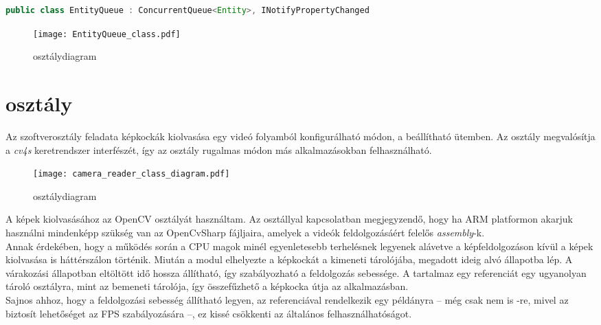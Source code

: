 \begin{mdframed}[backgroundcolor=gray!20]
\begin{small}
\begin{scriptsize}
\begin{lstlisting}[language=java]
public class EntityQueue : ConcurrentQueue<Entity>, INotifyPropertyChanged
\end{lstlisting}
\end{scriptsize}
\end{small}
\end{mdframed}

\begin{figure}[h]
\texttt{[image: EntityQueue\_class.pdf]}
\centering
\caption{ osztálydiagram}
\label{fig:entity_queue_class_diagram}
\end{figure}

\section{ osztály}

Az szoftverosztály feladata képkockák kiolvasása egy videó folyamból konfigurálható módon, a beállítható ütemben. Az osztály megvalósítja a \emph{cv4s} keretrendszer  interfészét, így az osztály rugalmas módon más alkalmazásokban felhasználható. \newpage
\begin{wrapfigure}{r}{7.5cm}
\texttt{[image: camera\_reader\_class\_diagram.pdf]}
\caption{ osztálydiagram}\label{fig:camera_reader_class_diagram}
\end{wrapfigure} 
A képek kiolvasásához az OpenCV  osztályát használtam. Az osztállyal kapcsolatban megjegyzendő, hogy ha ARM platformon akarjuk használni mindenképp szükség van az OpenCvSharp  fájljaira, amelyek a videók feldolgozásáért felelős \textit{assembly}-k.\\
Annak érdekében, hogy a működés során a CPU magok minél egyenletesebb terhelésnek legyenek alávetve a képfeldolgozáson kívül a képek kiolvasása is háttérszálon történik. Miután a modul elhelyezte a képkockát a kimeneti tárolójába, megadott ideig alvó állapotba lép. A várakozási állapotban eltöltött idő hossza állítható, így szabályozható a feldolgozás sebessége. A  tartalmaz egy referenciát egy ugyanolyan tároló osztályra, mint az  bemeneti tárolója, így összefűzhető a képkocka útja az alkalmazásban.\\
Sajnos ahhoz, hogy a feldolgozási sebesség állítható legyen, az  referenciával rendelkezik egy  példányra -- még csak nem is -re, mivel az biztosít lehetőséget az FPS szabályozására --, ez kissé csökkenti az általános felhasználhatóságot.

